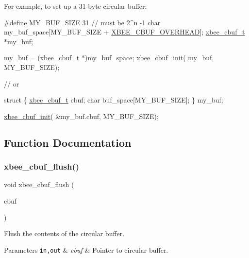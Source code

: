 For example, to set up a 31-\/byte circular buffer\+: 
\begin{DoxyCode}
\textcolor{preprocessor}{#define MY\_BUF\_SIZE 31        // must be 2^n -1}
\textcolor{keywordtype}{char} my\_buf\_space[MY\_BUF\_SIZE + \hyperlink{group__util__cbuf_ga6fb73f000c9aa3d2b26f3ae089676bfa}{XBEE\_CBUF\_OVERHEAD}];
\hyperlink{structxbee__cbuf__t}{xbee\_cbuf\_t} *my\_buf;

my\_buf = (\hyperlink{structxbee__cbuf__t}{xbee\_cbuf\_t} *)my\_buf\_space;
\hyperlink{group__util__cbuf_gabf58cafa9f3e989b433a14c23a94cebb}{xbee\_cbuf\_init}( my\_buf, MY\_BUF\_SIZE);

\textcolor{comment}{// or}

\textcolor{keyword}{struct }\{
   \hyperlink{structxbee__cbuf__t}{xbee\_cbuf\_t}    cbuf;
   \textcolor{keywordtype}{char}           buf\_space[MY\_BUF\_SIZE];
\} my\_buf;

\hyperlink{group__util__cbuf_gabf58cafa9f3e989b433a14c23a94cebb}{xbee\_cbuf\_init}( &my\_buf.cbuf, MY\_BUF\_SIZE);
\end{DoxyCode}
 

\subsection{Function Documentation}
\mbox{\label{group__util__cbuf_gaf0cf797a0e4ee8c9e518e0d8b9554b10}} 
\subsubsection{\texorpdfstring{xbee\+\_\+cbuf\+\_\+flush()}{xbee\_cbuf\_flush()}}
{\footnotesize\ttfamily void xbee\+\_\+cbuf\+\_\+flush (\begin{DoxyParamCaption}\item[{\hyperlink{structxbee__cbuf__t}{xbee\+\_\+cbuf\+\_\+t} \hyperlink{group__hal_gaef060b3456fdcc093a7210a762d5f2ed}{F\+AR} $\ast$}]{cbuf }\end{DoxyParamCaption})}



Flush the contents of the circular buffer. 


\begin{DoxyParams}[1]{Parameters}
\mbox{\tt in,out}  & {\em cbuf} & Pointer to circular buffer. \\
\hline
\end{DoxyParams}
\mbox{\label{group__util__cbuf_ga9a2eeedf642bdf31dba98aacdc5a7d75}} 
